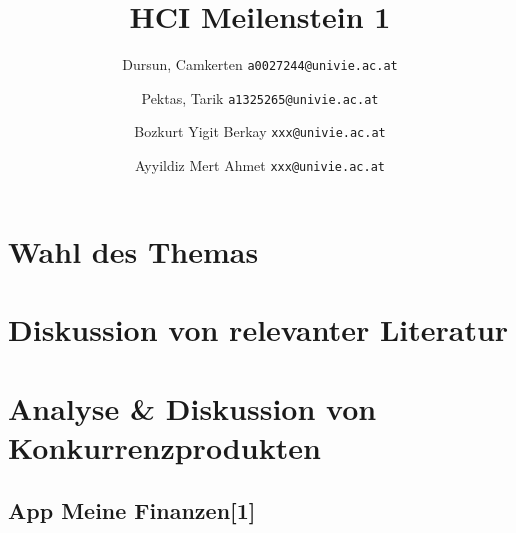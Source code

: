\documentclass[runningheads,a4paper]{llncs}
\begin{document}
\mainmatter  %

\title{HCI Meilenstein 1}


\author{
  Dursun, Camkerten
  \texttt{a0027244@univie.ac.at}
  \and
  Pektas, Tarik
  \texttt{a1325265@univie.ac.at}
  \and
  Bozkurt Yigit Berkay
  \texttt{xxx@univie.ac.at}
  \and
  Ayyildiz Mert Ahmet
  \texttt{xxx@univie.ac.at}
}



\maketitle

\section{Wahl des Themas }
\bigskip
\bigskip
\bigskip
\bigskip
\bigskip
\bigskip
\bigskip
\bigskip
\bigskip
\bigskip
\bigskip

\section{Diskussion von relevanter Literatur}
\clearpage




\section{Analyse \& Diskussion von Konkurrenzprodukten}
\subsection{App Meine Finanzen[1]}
\end{document}
